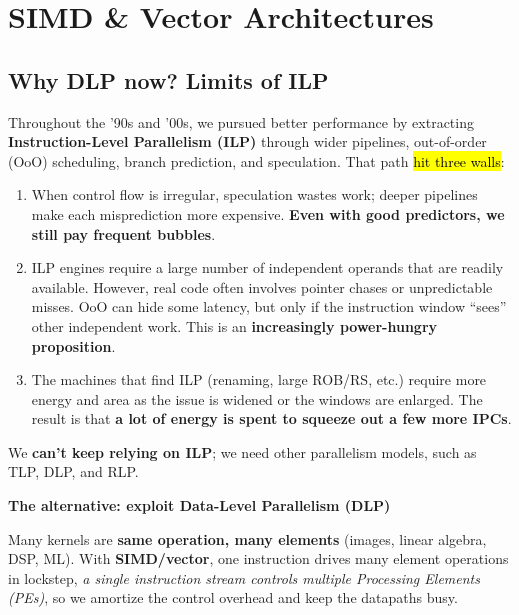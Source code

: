 \section{SIMD \& Vector Architectures}

\subsection{Why DLP now? Limits of ILP}

Throughout the '90s and '00s, we pursued better performance by extracting \textbf{Instruction-Level Parallelism (ILP)} through wider pipelines, out-of-order (OoO) scheduling, branch prediction, and speculation. That path \hl{hit three walls}:
\begin{enumerate}
    \item {} When control flow is irregular, speculation wastes work; deeper pipelines make each misprediction more expensive. \textbf{Even with good predictors, we still pay frequent bubbles}.
    

    \item {} ILP engines require a large number of independent operands that are readily available. However, real code often involves pointer chases or unpredictable misses. OoO can hide some latency, but only if the instruction window ``sees'' other independent work. This is an \textbf{increasingly power-hungry proposition}.


    \item {} The machines that find ILP (renaming, large ROB/RS, etc.) require more energy and area as the issue is widened or the windows are enlarged. The result is that \textbf{a lot of energy is spent to squeeze out a few more IPCs}.
\end{enumerate}
We \textbf{can't keep relying on ILP}; we need other parallelism models, such as TLP, DLP, and RLP.

\highspace
\begin{flushleft}
    \textcolor{Green3}{ \textbf{The alternative: exploit Data-Level Parallelism (DLP)}}
\end{flushleft}
Many kernels are \textbf{same operation, many elements} (images, linear algebra, DSP, ML). With \textbf{SIMD/vector}, one instruction drives many element operations in lockstep, \emph{a single instruction stream controls multiple Processing Elements (PEs)}, so we amortize the control overhead and keep the datapaths busy.

